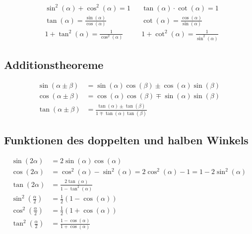 	
		\begin{align*}
			&\sin^2 \left( \alpha \right) + \cos^2 \left( \alpha \right) = 1 & &\tan \left( \alpha \right) \cdot \cot \left( \alpha \right) = 1	
			\\
			&\tan \left( \alpha \right) = \frac{\sin \left( \alpha \right)}{\cos \left( \alpha \right)} & &\cot \left( \alpha \right) = \frac{\cos \left( \alpha \right)}{\sin \left( \alpha \right)} 
			\\
			&1 + \tan^2 \left( \alpha \right) = \frac{1}{\cos^2 \left( \alpha \right)} & &1 + \cot^2 \left( \alpha \right) = \frac{1}{\sin^2 \left( \alpha \right)}
		\end{align*}
	
	\vspace{10mm}
	\subsection{Additionstheoreme}
	
	
		\begin{align*}
			\sin \left( \alpha \pm \beta \right) &= \sin \left( \alpha \right) \cos \left( \beta \right) \pm \cos \left( \alpha \right) \sin \left( \beta \right)
			\\ 
			\cos \left( \alpha \pm \beta \right) &= \cos \left( \alpha \right) \cos \left( \beta \right) \mp \sin \left( \alpha \right) \sin \left( \beta \right)
			\\
			\tan \left( \alpha \pm \beta \right) &= \frac{\tan \left( \alpha \right) \pm \tan \left( \beta \right)}{1 \mp \tan \left( \alpha \right) \tan \left( \beta \right)}
		\end{align*}
		
	\vspace{10mm}
	\subsection{Funktionen des doppelten und halben Winkels}
			
			
			\begin{align*}
				\sin \left( 2 \alpha \right) &= 2 \sin \left( \alpha \right) \cos \left( \alpha \right) 
				\\
				\cos \left( 2 \alpha \right) &= \cos^2 \left( \alpha \right) - \sin^2 \left( \alpha \right) = 2 \cos^2 \left( \alpha \right) -1 = 1 - 2 \sin^2 \left( \alpha \right)
				\\
				\tan \left( 2 \alpha \right) &= \frac{2 \tan \left( \alpha \right)}{1 - \tan^2 \left( \alpha \right)}
				\\
				\sin^2 \left( \frac{\alpha}{2} \right) &= \frac{1}{2} \left( 1 - \cos \left( \alpha \right) \right)
				\\
				\cos^2 \left( \frac{\alpha}{2} \right) &= \frac{1}{2} \left( 1 + \cos \left( \alpha \right) \right)
				\\
				\tan^2 \left( \frac{\alpha}{2} \right) &= \frac{1 - \cos \left( \alpha \right)}{1 + \cos \left( \alpha \right)}
			\end{align*}
			
